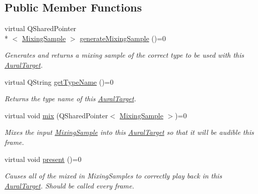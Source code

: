 \subsection*{Public Member Functions}
\begin{DoxyCompactItemize}
\item 
virtual Q\-Shared\-Pointer\\*
$<$ \hyperlink{class_picto_1_1_mixing_sample}{Mixing\-Sample} $>$ \hyperlink{class_picto_1_1_aural_target_a1de8975e412fba2acb355f4a0d68997d}{generate\-Mixing\-Sample} ()=0
\begin{DoxyCompactList}\small\item\em Generates and returns a mixing sample of the correct type to be used with this \hyperlink{class_picto_1_1_aural_target}{Aural\-Target}. \end{DoxyCompactList}\item 
\hypertarget{class_picto_1_1_aural_target_ae68c1738d4011944c6104aca155ac5fd}{virtual Q\-String \hyperlink{class_picto_1_1_aural_target_ae68c1738d4011944c6104aca155ac5fd}{get\-Type\-Name} ()=0}\label{class_picto_1_1_aural_target_ae68c1738d4011944c6104aca155ac5fd}

\begin{DoxyCompactList}\small\item\em Returns the type name of this \hyperlink{class_picto_1_1_aural_target}{Aural\-Target}. \end{DoxyCompactList}\item 
virtual void \hyperlink{class_picto_1_1_aural_target_af4ae061fb6f1edb78843d9b1ac69fd0b}{mix} (Q\-Shared\-Pointer$<$ \hyperlink{class_picto_1_1_mixing_sample}{Mixing\-Sample} $>$)=0
\begin{DoxyCompactList}\small\item\em Mixes the input \hyperlink{class_picto_1_1_mixing_sample}{Mixing\-Sample} into this \hyperlink{class_picto_1_1_aural_target}{Aural\-Target} so that it will be audible this frame. \end{DoxyCompactList}\item 
virtual void \hyperlink{class_picto_1_1_aural_target_a75d7885362d309900041bb7b02c3cfa1}{present} ()=0
\begin{DoxyCompactList}\small\item\em Causes all of the mixed in Mixing\-Samples to correctly play back in this \hyperlink{class_picto_1_1_aural_target}{Aural\-Target}. Should be called every frame. \end{DoxyCompactList}\end{DoxyCompactItemize}


